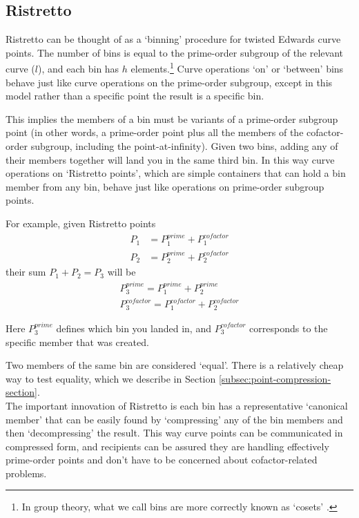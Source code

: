\subsection{Ristretto}
\label{subsec:ristretto}

Ristretto can be thought of as a `binning' procedure for twisted Edwards curve points. The number of bins is equal to the prime-order subgroup of the relevant curve ($l$), and each bin has $h$ elements.\footnote{In group theory, what we call bins are more correctly known as `cosets' \cite{coset-wikibooks}.} Curve operations `on' or `between' bins behave just like curve operations on the prime-order subgroup, except in this model rather than a specific point the result is a specific bin.

This implies the members of a bin must be variants of a prime-order subgroup point (in other words, a prime-order point plus all the members of the cofactor-order subgroup, including the point-at-infinity). Given two bins, adding any of their members together will land you in the same third bin. In this way curve operations on `Ristretto points', which are simple containers that can hold a bin member from any bin, behave just like operations on prime-order subgroup points.

For example, given Ristretto points
\begin{align*}
    P_1 &= P^{prime}_1 + P^{cofactor}_1 \\
    P_2 &= P^{prime}_2 + P^{cofactor}_2
\end{align*}
their sum $P_1 + P_2 = P_3$ will be
\begin{align*}
    P^{prime}_3 = P^{prime}_1 + P^{prime}_2 \\
    P^{cofactor}_3 = P^{cofactor}_1 + P^{cofactor}_2
\end{align*}

Here $P^{prime}_3$ defines which bin you landed in, and $P^{cofactor}_3$ corresponds to the specific member that was created.

Two members of the same bin are considered `equal'. There is a relatively cheap way to test equality, which we describe in Section \ref{subsec:point-compression-section}.\\

The important innovation of Ristretto is each bin has a representative `canonical member' that can be easily found by `compressing' any of the bin members and then `decompressing' the result. This way curve points can be communicated in compressed form, and recipients can be assured they are handling effectively prime-order points and don't have to be concerned about cofactor-related problems.

